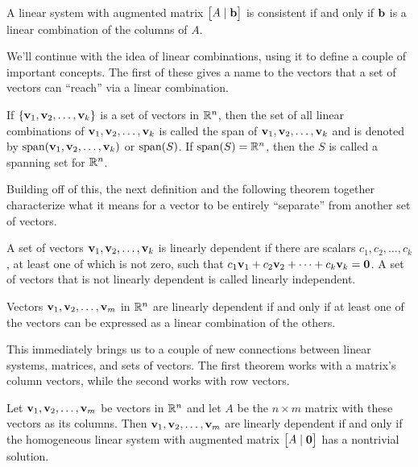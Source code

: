 \documentclass[../m073main.tex]{subfiles}
\begin{document}
\begin{theorem}
	A linear system with augmented matrix $\begin{bmatrix} A \;|\; \mathbf{b} \end{bmatrix}$ is consistent if and only if $\mathbf{b}$ is a linear combination of the columns of $A$.
\end{theorem}

We'll continue with the idea of linear combinations, using it to define a couple of important concepts.
The first of these gives a name to the vectors that a set of vectors can ``reach'' via a linear combination.

\begin{definition}[Span]
	If $\{\mathbf{v}_1, \mathbf{v}_2, \ldots, \mathbf{v}_k\}$ is a set of vectors in $\mathbb{R}^n$, then the set of all linear combinations of $\mathbf{v}_1, \mathbf{v}_2, \ldots, \mathbf{v}_k$ is called the span of $\mathbf{v}_1, \mathbf{v}_2, \ldots, \mathbf{v}_k$ and is denoted by $\textrm{span}(\mathbf{v}_1, \mathbf{v}_2, \ldots, \mathbf{v}_k)$ or $\textrm{span}(S)$.
	If $\textrm{span}(S) = \mathbb{R}^n$, then the $S$ is called a spanning set for $\mathbb{R}^n$.
\end{definition}

Building off of this, the next definition and the following theorem together characterize what it means for a vector to be entirely ``separate'' from another set of vectors.

\begin{definition}
	A set of vectors $\mathbf{v}_1, \mathbf{v}_2, \ldots, \mathbf{v}_k$ is linearly dependent if there are scalars $c_1, c_2, \ldots, c_k$, at least one of which is not zero, such that $c_1 \mathbf{v}_1 + c_2 \mathbf{v}_2 + \cdots + c_k \mathbf{v}_k = \mathbf{0}$.
	A set of vectors that is not linearly dependent is called linearly independent.
\end{definition}

\begin{theorem}
	Vectors $\mathbf{v}_1, \mathbf{v}_2, \ldots, \mathbf{v}_m$ in $\mathbb{R}^n$ are linearly dependent if and only if at least one of the vectors can be expressed as a linear combination of the others.
\end{theorem}

This immediately brings us to a couple of new connections between linear systems, matrices, and sets of vectors.
The first theorem works with a matrix's column vectors, while the second works with row vectors.

\begin{theorem}
	Let $\mathbf{v}_1, \mathbf{v}_2, \ldots, \mathbf{v}_m$ be vectors in $\mathbb{R}^n$ and let $A$ be the $n \times m$ matrix with these vectors as its columns.
	Then $\mathbf{v}_1, \mathbf{v}_2, \ldots, \mathbf{v}_m$ are linearly dependent if and only if the homogeneous linear system with augmented matrix $\begin{bmatrix} A \;|\; \mathbf{0} \end{bmatrix}$ has a nontrivial solution.
\end{theorem}
\end{document}
